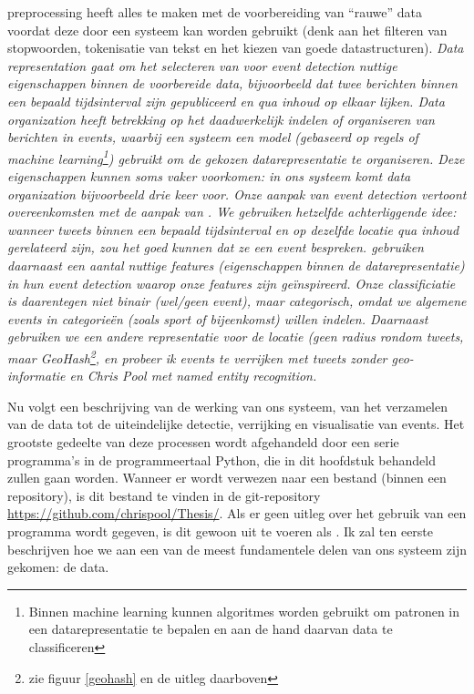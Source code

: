 {{{preprocessing} heeft alles te maken met de voorbereiding van ``rauwe'' data voordat 
deze door een systeem kan worden gebruikt (denk aan het filteren van 
stopwoorden, tokenisatie van tekst en het kiezen van goede datastructuren). 
\it{Data representation} gaat om het selecteren van voor event detection nuttige 
eigenschappen binnen de voorbereide data, bijvoorbeeld dat twee berichten binnen 
een bepaald tijdsinterval zijn gepubliceerd en qua inhoud op elkaar lijken. \it{Data 
organization} heeft betrekking op het daadwerkelijk indelen of organiseren van 
berichten in events, waarbij een systeem een model (gebaseerd op regels of 
\it{machine learning}\footnote{Binnen machine learning kunnen algoritmes worden 
gebruikt om patronen in een datarepresentatie te bepalen en aan de hand daarvan
data te classificeren}) gebruikt om de gekozen datarepresentatie te organiseren. 
Deze eigenschappen kunnen soms vaker voorkomen: in ons systeem komt data organization
bijvoorbeeld drie keer voor.
\vl
Onze aanpak van event detection vertoont overeenkomsten met de aanpak van 
\citeauthor{walther2013geo}. We gebruiken hetzelfde achterliggende idee: wanneer tweets 
binnen een bepaald tijdsinterval en op dezelfde locatie qua inhoud gerelateerd 
zijn, zou het goed kunnen dat ze een event bespreken. \citeauthor{walther2013geo} gebruiken 
daarnaast een aantal nuttige \it{features} (eigenschappen binnen de datarepresentatie) in 
hun event detection waarop onze features zijn geïnspireerd. Onze classificiatie 
is daarentegen niet \it{binair} (wel/geen event), maar \it{categorisch}, omdat we algemene 
events in categorieën (zoals \it{sport} of \it{bijeenkomst}) willen indelen. Daarnaast gebruiken we een andere 
representatie voor de locatie (geen radius rondom tweets, maar \it{GeoHash}\footnote{zie 
figuur \ref{geohash} en de uitleg daarboven}, en probeer ik events te verrijken met tweets zonder geo-informatie en 
Chris Pool met named \it{entity recognition}.

\label{methode}

Nu volgt een beschrijving van de werking van ons systeem, van het verzamelen 
van de data tot de uiteindelijke detectie, verrijking en visualisatie van 
events. Het grootste gedeelte van deze processen wordt afgehandeld door een 
serie programma's in de programmeertaal Python, die in dit hoofdstuk behandeld 
zullen gaan worden. Wanneer er wordt verwezen naar een bestand (binnen een 
repository), is dit bestand te vinden in de git-repository 
\url{https://github.com/chrispool/Thesis/}. Als er geen uitleg over het gebruik 
van een programma wordt gegeven, is dit gewoon uit te voeren als 
. Ik zal ten eerste beschrijven hoe we aan een van de 
meest fundamentele delen van ons systeem zijn gekomen: de data.

}}
